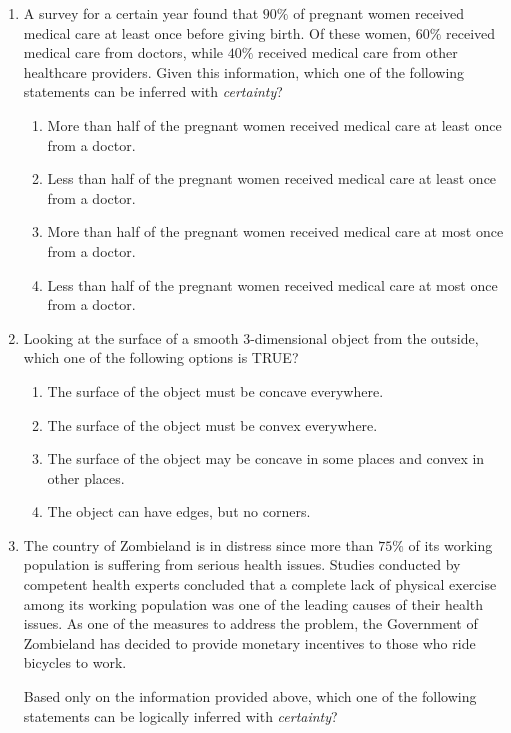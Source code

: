 \documentclass[journal,12pt,onecolumn]{IEEEtran}
\theoremstyle{remark}
\begin{document}
\begin{enumerate}
		\item A survey for a certain year found that $90\%$ of pregnant women received medical care at least once before giving birth. Of these women, $60\%$ received medical care from doctors, while $40\%$ received medical care from other healthcare providers. Given this information, which one of the following statements can be inferred with \textit{certainty}?
		\hfill{}
		
		\begin{enumerate}
			\item More than half of the pregnant women received medical care at least once from a doctor.
			\item Less than half of the pregnant women received medical care at least once from a doctor.
			\item More than half of the pregnant women received medical care at most once from a doctor.
			\item Less than half of the pregnant women received medical care at most once from a doctor.
		\end{enumerate}
		
		\item Looking at the surface of a smooth $3$-dimensional object from the outside, which one of the following options is TRUE?
		\hfill{}
		
		\begin{enumerate}
			\item The surface of the object must be concave everywhere.
			\item The surface of the object must be convex everywhere.
			\item The surface of the object may be concave in some places and convex in other places.
			\item The object can have edges, but no corners.
		\end{enumerate}
		
		\item The country of Zombieland is in distress since more than $75\%$ of its working population is suffering from serious health issues. Studies conducted by competent health experts concluded that a complete lack of physical exercise among its working population was one of the leading causes of their health issues. As one of the measures to address the problem, the Government of Zombieland has decided to provide monetary incentives to those who ride bicycles to work.
		
		Based only on the information provided above, which one of the following statements can be logically inferred with \textit{certainty}?
		\hfill{}
		

\end{enumerate}
\end{document}
